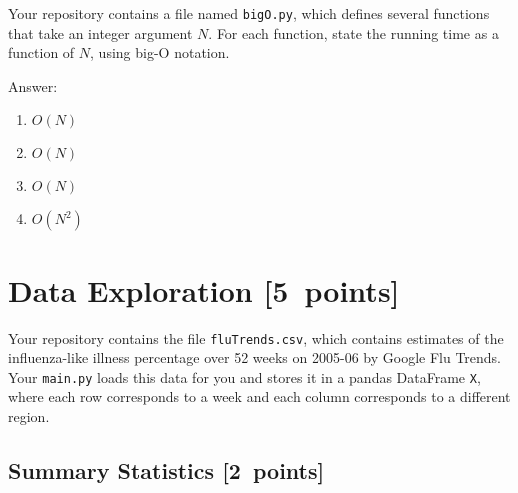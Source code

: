 \documentclass{article}
\newcommand{\blu}[1]{{\textcolor{blu}{#1}}}
\newcommand{\gre}[1]{\textcolor{gre}{#1}}
\newcommand\ans[1]{\par\gre{Answer: #1}}
\let\ask\blu
\newcommand\pts[1]{\textcolor{pointscolour}{[#1~points]}}
\begin{document}
  Your repository contains a file named \texttt{bigO.py}, which defines several functions
  that take an integer argument $N$. For each function, \ask{state the running time as a function of $N$, using big-O notation}.
  \ans{
  \begin{enumerate}
  \item $O(N)$
  \item $O(N)$
  \item $O(N)$
  \item $O(N^2)$
  \end{enumerate}
  }
  \newpage
  \section{Data Exploration \pts{5}}


  Your repository contains the file \texttt{fluTrends.csv}, which contains estimates
  of the influenza-like illness percentage over 52 weeks on 2005-06 by Google Flu Trends.
  Your \texttt{main.py} loads this data for you and stores it in a pandas DataFrame \texttt{X},
  where each row corresponds to a week and each column
  corresponds to a different
  region. 

  \subsection{Summary Statistics \pts{2}}
\end{document}
